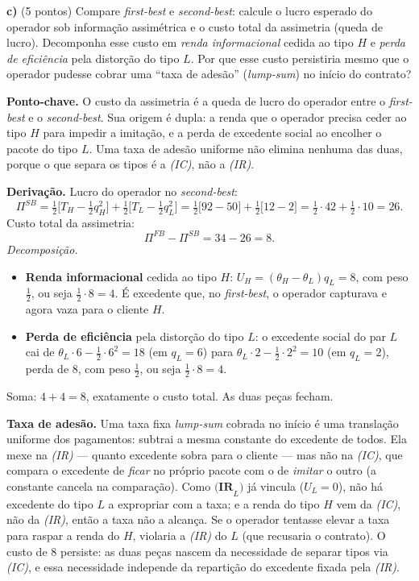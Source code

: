 \textbf{c)} (5 pontos) Compare \emph{first-best} e \emph{second-best}: calcule o lucro esperado do operador sob informação assimétrica e o custo total da assimetria (queda de lucro). Decomponha esse custo em \emph{renda informacional} cedida ao tipo $H$ e \emph{perda de eficiência} pela distorção do tipo $L$. Por que esse custo persistiria mesmo que o operador pudesse cobrar uma ``taxa de adesão'' (\emph{lump-sum}) no início do contrato?
\resolucaobox{7.2cm}
\begin{solucao}
\textbf{Ponto-chave.} O custo da assimetria é a queda de lucro do operador entre o \emph{first-best} e o \emph{second-best}. Sua origem é dupla: a renda que o operador precisa ceder ao tipo $H$ para impedir a imitação, e a perda de excedente social ao encolher o pacote do tipo $L$. Uma taxa de adesão uniforme não elimina nenhuma das duas, porque o que separa os tipos é a \emph{(IC)}, não a \emph{(IR)}.

\textbf{Derivação.} Lucro do operador no \emph{second-best}:
\[
\Pi^{SB} = \tfrac{1}{2}\big[T_H - \tfrac{1}{2}q_H^2\big] + \tfrac{1}{2}\big[T_L - \tfrac{1}{2}q_L^2\big]
= \tfrac{1}{2}\big[92 - 50\big] + \tfrac{1}{2}\big[12 - 2\big] = \tfrac{1}{2}\cdot 42 + \tfrac{1}{2}\cdot 10 = 26.
\]
Custo total da assimetria:
\[
\Pi^{FB} - \Pi^{SB} = 34 - 26 = 8.
\]
\emph{Decomposição.}
\begin{itemize}
\item \textbf{Renda informacional} cedida ao tipo $H$: $U_H = (\theta_H-\theta_L)q_L = 8$, com peso $\tfrac{1}{2}$, ou seja $\tfrac{1}{2}\cdot 8 = 4$. É excedente que, no \emph{first-best}, o operador capturava e agora vaza para o cliente $H$.
\item \textbf{Perda de eficiência} pela distorção do tipo $L$: o excedente social do par $L$ cai de $\theta_L\cdot 6 - \tfrac{1}{2}\cdot 6^2 = 18$ (em $q_L=6$) para $\theta_L\cdot 2 - \tfrac{1}{2}\cdot 2^2 = 10$ (em $q_L=2$), perda de $8$, com peso $\tfrac{1}{2}$, ou seja $\tfrac{1}{2}\cdot 8 = 4$.
\end{itemize}
Soma: $4 + 4 = 8$, exatamente o custo total. As duas peças fecham.

\textbf{Taxa de adesão.} Uma taxa fixa \emph{lump-sum} cobrada no início é uma translação uniforme dos pagamentos: subtrai a mesma constante do excedente de todos. Ela mexe na \emph{(IR)} --- quanto excedente sobra para o cliente --- mas não na \emph{(IC)}, que compara o excedente de \emph{ficar} no próprio pacote com o de \emph{imitar} o outro (a constante cancela na comparação). Como $\textbf{(IR}_L\textbf{)}$ já vincula ($U_L=0$), não há excedente do tipo $L$ a expropriar com a taxa; e a renda do tipo $H$ vem da \emph{(IC)}, não da \emph{(IR)}, então a taxa não a alcança. Se o operador tentasse elevar a taxa para raspar a renda do $H$, violaria a \emph{(IR)} do $L$ (que recusaria o contrato). O custo de $8$ persiste: as duas peças nascem da necessidade de separar tipos via \emph{(IC)}, e essa necessidade independe da repartição do excedente fixada pela \emph{(IR)}.


\end{solucao}
